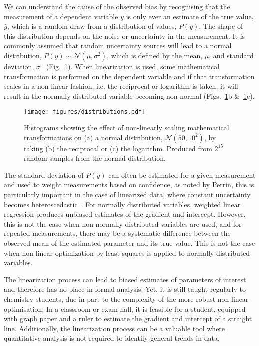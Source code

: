 \documentclass[journal=jceda8,manuscript=article]{achemso}
\begin{document}
We can understand the cause of the observed bias by recognising that the measurement of a dependent variable $y$ is only ever an estimate of the true value, $\hat{y}$, which is a random draw from a distribution of values, $P(y)$. 
The shape of this distribution depends on the noise or uncertainty in the measurement. 
It is commonly assumed that random uncertainty sources will lead to a normal distribution, $P(y) \sim \mathcal{N}(\mu, \sigma^2)$, which is defined by the mean, $\mu$, and standard deviation, $\sigma$~\cite{monk_math_2010} (Fig.~\ref{fig:distributions}).
When linearization is used, some mathematical transformation is performed on the dependent variable and if that transformation scales in a non-linear fashion, i.e. the reciprocal or logarithm is taken, it will result in the normally distributed variable becoming non-normal (Figs.~\ref{fig:distributions}b \&~\ref{fig:distributions}c).
%
\begin{figure}
  \texttt{[image: figures/distributions.pdf]}
  \caption{
    Histograms showing the effect of non-linearly scaling mathematical transformations on (a) a normal distribution, $\mathcal{N}(50, 10^2)$, by taking (b) the reciprocal or (c) the logarithm. 
    Produced from $2^{15}$ random samples from the normal distribution.
    }
  \label{fig:distributions}
\end{figure}
%

The standard deviation of $P(y)$ can often be estimated for a given measurement and used to weight measurements based on confidence, as noted by Perrin, this is particularly important in the case of linearized data, where constant uncertainty becomes heteroscedastic~\cite{perrin_linear_2017}.
For normally distributed variables, weighted linear regression produces unbiased estimates of the gradient and intercept. 
However, this is not the case when non-normally distributed variables are used, and for repeated measurements, there may be a systematic difference between the observed mean of the estimated parameter and its true value.
This is not the case when non-linear optimization by least squares is applied to normally distributed variables. 

The linearization process can lead to biased estimates of parameters of interest and therefore has no place in formal analysis. 
Yet, it is still taught regularly to chemistry students, due in part to the complexity of the more robust non-linear optimisation. 
In a classroom or exam hall, it is feasible for a student, equipped with graph paper and a ruler to estimate the gradient and intercept of a straight line. 
Additionally, the linearization process can be a valuable tool where quantitative analysis is not required to identify general trends in data. 
\end{document}
